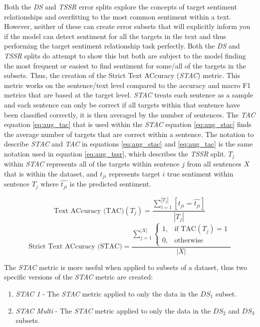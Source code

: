 Both the \textit{DS} and \textit{TSSR} error splits explore the concepts of target sentiment relationships and overfitting to the most common sentiment within a text. However, neither of these can create error subsets that will explicitly inform you if the model can detect sentiment for all the targets in the text and thus performing the target sentiment relationship task perfectly. Both the \textit{DS} and \textit{TSSR} splits do attempt to show this but both are subject to the model finding the most frequent or easiest to find sentiment for some/all of the targets in the subsets. Thus, the creation of the Strict Text ACcuracy (\textit{STAC}) metric. This metric works on the sentence/text level compared to the accuracy and macro F1 metrics that are based at the target level. \textit{STAC} treats each sentence as a sample and each sentence can only be correct if all targets within that sentence have been classified correctly, it is then averaged by the number of sentences. The \textit{TAC} equation \ref{eq:aug_tac} that is used within the \textit{STAC} equation \ref{eq:aug_stac} finds the average number of targets that are correct within a sentence. The notation to describe \textit{STAC} and \textit{TAC} in equations \ref{eq:aug_stac} and \ref{eq:aug_tac} is the same notation used in equation \ref{eq:aug_tssr}, which describes the \textit{TSSR} split. $T_j$ within \textit{STAC} represents all of the targets within sentence $j$ from all sentences $X$ that is within the dataset, and $t_{ji}$ represents target $i$ true sentiment within sentence $T_j$ where $\hat{t_{ji}}$ is the predicted sentiment.

\begin{equation}
    \text{Text ACcuracy (TAC)}(T_j) = \frac{\sum_{i=1}^{|T_j|} [t_{ji}=\hat{t_{ji}}]}{|T_j|}
    \label{eq:aug_tac}
\end{equation}
\begin{equation}
    \text{Strict Text ACcuracy (STAC)} = \frac{\sum_{j=1}^{|X|} \begin{cases}
    1,& \text{if } \text{TAC}(T_j) = 1\\
    0,              & \text{otherwise}
\end{cases}}{|X|}
\label{eq:aug_stac}
\end{equation}

The \textit{STAC} metric is more useful when applied to subsets of a dataset, thus two specific versions of the \textit{STAC} metric are created:
\begin{enumerate}
    \item \textit{STAC 1} - The \textit{STAC} metric applied to only the data in the $DS_1$ subset.
    \item \textit{STAC Multi} - The \textit{STAC} metric applied to only the data in the $DS_2$ and $DS_3$ subsets.
\end{enumerate}

